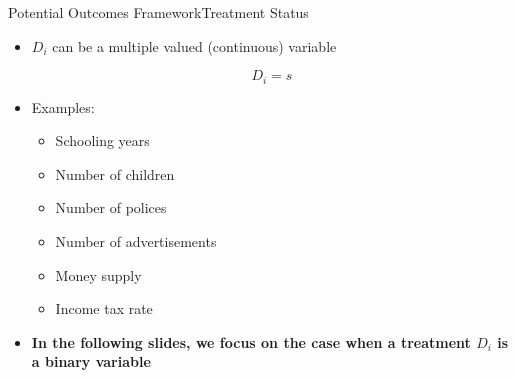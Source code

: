 \documentclass[hyperref={pdfpagelabels=false}]{beamer}
\begin{document}
\begin{frame}{Potential Outcomes Framework}{Treatment Status}
\begin{itemize} 
\item $D_i$ can be a multiple valued (continuous) variable

\begin{equation*}
D_i= s
\end{equation*}
\item Examples:
\vspace{0.2cm}
\begin{itemize}
\item Schooling years
\vspace{0.2cm}
\item Number of children
\vspace{0.2cm}
\item Number of polices
\vspace{0.2cm}
\item Number of advertisements
\vspace{0.2cm}
\item Money supply 
\vspace{0.2cm}
\item Income tax rate
\end{itemize}
\vspace{0.2cm}
\item \textbf{In the following slides, we focus on the case when a treatment $D_i$ is a binary variable}
\end{itemize}
\end{frame}
\end{document}
